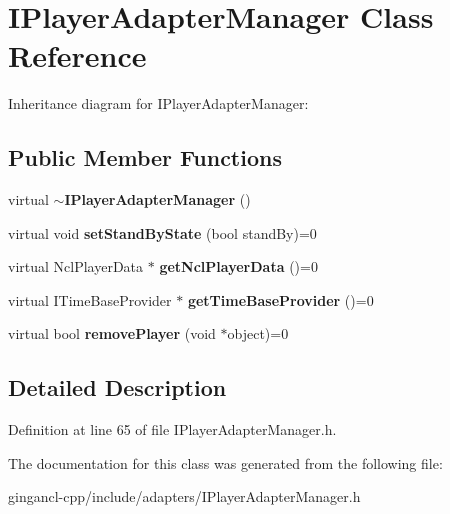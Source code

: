 \section{IPlayerAdapterManager Class Reference}
\label{classbr_1_1pucrio_1_1telemidia_1_1ginga_1_1ncl_1_1adapters_1_1IPlayerAdapterManager}
Inheritance diagram for IPlayerAdapterManager:\subsection*{Public Member Functions}
\begin{CompactItemize}
\item 
virtual {\bf $\sim$IPlayerAdapterManager} ()\label{classbr_1_1pucrio_1_1telemidia_1_1ginga_1_1ncl_1_1adapters_1_1IPlayerAdapterManager_0957874c82449715a6a2f678c1db724e}

\item 
virtual void \textbf{setStandByState} (bool standBy)=0\label{classbr_1_1pucrio_1_1telemidia_1_1ginga_1_1ncl_1_1adapters_1_1IPlayerAdapterManager_c83ec76c8cff0a8f344e395866c040a4}

\item 
virtual NclPlayerData $\ast$ \textbf{getNclPlayerData} ()=0\label{classbr_1_1pucrio_1_1telemidia_1_1ginga_1_1ncl_1_1adapters_1_1IPlayerAdapterManager_23ff47a82d75f2c1441da8177d3401e5}

\item 
virtual ITimeBaseProvider $\ast$ \textbf{getTimeBaseProvider} ()=0\label{classbr_1_1pucrio_1_1telemidia_1_1ginga_1_1ncl_1_1adapters_1_1IPlayerAdapterManager_6166310bf0add8def73a89b3e61bd493}

\item 
virtual bool \textbf{removePlayer} (void $\ast$object)=0\label{classbr_1_1pucrio_1_1telemidia_1_1ginga_1_1ncl_1_1adapters_1_1IPlayerAdapterManager_90883da124201c0803453e4f3e1eef9b}

\end{CompactItemize}


\subsection{Detailed Description}




Definition at line 65 of file IPlayerAdapterManager.h.

The documentation for this class was generated from the following file:\begin{CompactItemize}
\item 
gingancl-cpp/include/adapters/IPlayerAdapterManager.h\end{CompactItemize}
